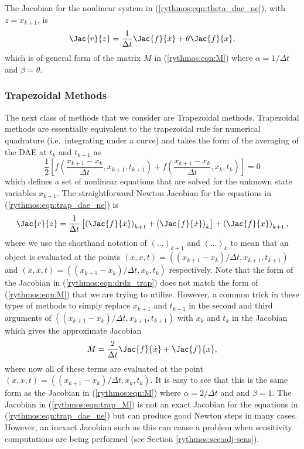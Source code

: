 \documentclass[pdf,ps2pdf,11pt]{SANDreport}
\begin{document}
The Jacobian for the nonlinear system in (\ref{rythmos:eqn:theta_dae_ne}), with
$z = x_{k+1}$, is
%
\begin{equation}
\Jac{r}{z}
= \frac{1}{\Delta t} \Jac{f}{\dot{x}} + \theta \Jac{f}{x},
\label{rythmos:eqn:M_theta}
\end{equation}
%
which is of general form of the matrix $M$ in (\ref{rythmos:eqn:M}) where
$\alpha = 1 / \Delta t$ and $\beta = \theta$.

\subsubsection{Trapezoidal Methods}

The next class of methods that we consider are Trapezoidal methods.
Trapezoidal methods are essentially equivalent to the trapezoidal rule for
numerical quadrature (i.e.\ integrating under a curve) and takes the form of
the averaging of the DAE at $t_k$ and $t_{k+1}$ as
%
\begin{equation}
\frac{1}{2} \left[
f\left( \frac{x_{k+1} - x_{k}}{\Delta t}, x_{k+1} , t_{k+1} \right)
+ f\left( \frac{x_{k+1} - x_{k}}{\Delta t}, x_k , t_k \right)
\right]
 = 0
\label{rythmos:eqn:trap_dae_ne}
\end{equation}
%
which defines a set of nonlinear equations that are solved for the unknown
state variables $x_{k+1}$.  The straightforward Newton Jacobian for the
equations in (\ref{rythmos:eqn:trap_dae_ne}) is
%
\begin{equation}
\Jac{r}{z}
= \frac{1}{\Delta t} \left[
\left( \Jac{f}{\dot{x}} \right)_{k+1}
+ \left( \Jac{f}{\dot{x}} \right)_{k}
\right]
+ \left( \Jac{f}{x} \right)_{k+1},
\label{rythmos:eqn:drdz_trap}
\end{equation}
%
where we use the shorthand notation of $(\ldots)_{k+1}$ and $(\ldots)_k$ to
mean that an object is evaluated at the points $(\dot{x},x,t) =
((x_{k+1}-x_k)/\Delta t, x_{k+1}, t_{k+1})$ and $(\dot{x},x,t) =
((x_{k+1}-x_k)/\Delta t, x_k, t_k)$ respectively.  Note that the form of the
Jacobian in (\ref{rythmos:eqn:drdz_trap}) does not match the form of
(\ref{rythmos:eqn:M}) that we are trying to utilize.  However, a common trick
in these types of methods to simply replace $x_{k+1}$ and $t_{k+1}$ in the
second and third arguments of $((x_{k+1}-x_k)/\Delta t, x_{k+1}, t_{k+1})$
with $x_k$ and $t_k$ in the Jacobian which gives the approximate Jacobian
%
\begin{equation}
M
= \frac{2}{\Delta t} \Jac{f}{\dot{x}}
+ \Jac{f}{x},
\label{rythmos:eqn:trap_M}
\end{equation}
%
where now all of these terms are evaluated at the point $(\dot{x},x,t) =
((x_{k+1}-x_k)/\Delta t, x_k, t_k)$.  It is easy to see that this is the same
form as the Jacobian in (\ref{rythmos:eqn:M}) where $\alpha = 2/\Delta t$ and
and $\beta = 1$.  The Jacobian in (\ref{rythmos:eqn:trap_M}) is not an exact
Jacobian for the equations in (\ref{rythmos:eqn:trap_dae_ne}) but can produce
good Newton steps in many cases.  However, an inexact Jacobian such as this
can cause a problem when sensitivity computations are being performed (see
Section {}\ref{rythmos:sec:adj-sens}).
\end{document}
